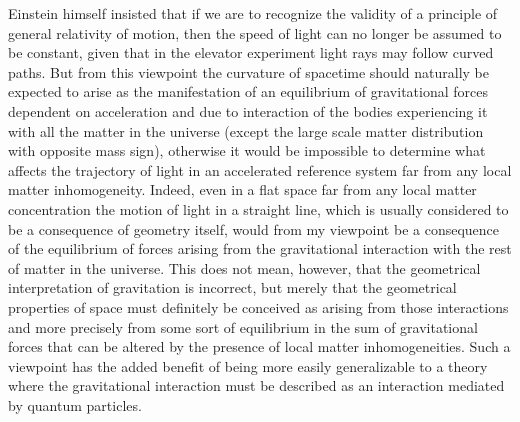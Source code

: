 \documentclass[notitlepage,12pt]{report}
\begin{document}
Einstein himself insisted that if we are to recognize the validity of a principle of general relativity of motion, then the speed of light can no longer be assumed to be constant, given that in the elevator experiment light rays may follow curved paths. But from this viewpoint the curvature of spacetime should naturally be expected to arise as the manifestation of an equilibrium of gravitational forces dependent on acceleration and due to interaction of the bodies experiencing it with all the matter in the universe (except the large scale matter distribution with opposite mass sign), otherwise it would be impossible to determine what affects the trajectory of light in an accelerated reference system far from any local matter inhomogeneity. Indeed, even in a flat space far from any local matter concentration the motion of light in a straight line, which is usually considered to be a consequence of geometry itself, would from my viewpoint be a consequence of the equilibrium of forces arising from the gravitational interaction with the rest of matter in the universe. This does not mean, however, that the geometrical interpretation of gravitation is incorrect, but merely that the geometrical properties of space must definitely be conceived as arising from those interactions and more precisely from some sort of equilibrium in the sum of gravitational forces that can be altered by the presence of local matter inhomogeneities. Such a viewpoint has the added benefit of being more easily generalizable to a theory where the gravitational interaction must be described as an interaction mediated by quantum particles.
\end{document}
